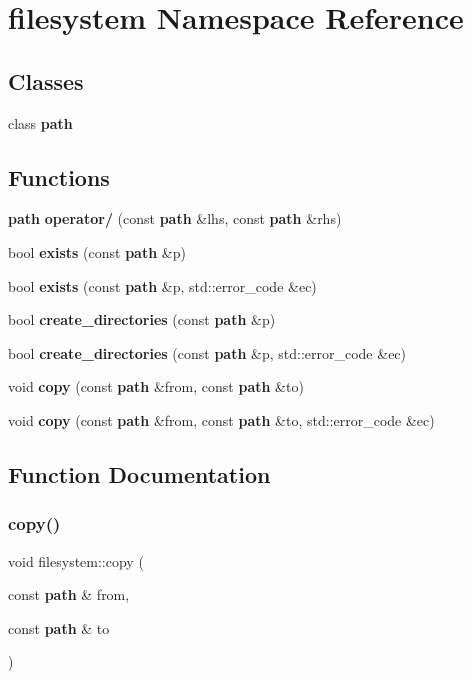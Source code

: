 \section{filesystem Namespace Reference}
\label{namespacefilesystem}
\subsection*{Classes}
\begin{DoxyCompactItemize}
\item 
class \textbf{ path}
\end{DoxyCompactItemize}
\subsection*{Functions}
\begin{DoxyCompactItemize}
\item 
\textbf{ path} \textbf{ operator/} (const \textbf{ path} \&lhs, const \textbf{ path} \&rhs)
\item 
bool \textbf{ exists} (const \textbf{ path} \&p)
\item 
bool \textbf{ exists} (const \textbf{ path} \&p, std\+::error\+\_\+code \&ec)
\item 
bool \textbf{ create\+\_\+directories} (const \textbf{ path} \&p)
\item 
bool \textbf{ create\+\_\+directories} (const \textbf{ path} \&p, std\+::error\+\_\+code \&ec)
\item 
void \textbf{ copy} (const \textbf{ path} \&from, const \textbf{ path} \&to)
\item 
void \textbf{ copy} (const \textbf{ path} \&from, const \textbf{ path} \&to, std\+::error\+\_\+code \&ec)
\end{DoxyCompactItemize}


\subsection{Function Documentation}
\mbox{\label{namespacefilesystem_a2c036bcc7d47af04cc1369fabf16e9db}} 
\subsubsection{copy()\hspace{0.1cm}{\footnotesize\ttfamily [1/2]}}
{\footnotesize\ttfamily void filesystem\+::copy (\begin{DoxyParamCaption}\item[{const \textbf{ path} \&}]{from,  }\item[{const \textbf{ path} \&}]{to }\end{DoxyParamCaption})}

